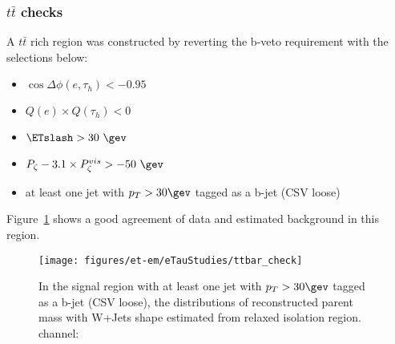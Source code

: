 \subsubsection{$t\bar{t}$ checks}
A $t\bar{t}$ rich region was constructed by reverting the b-veto requirement with
the selections below:
\begin{itemize}
  \item $\cos{\Delta \phi (e,\tau_{h})}<-0.95$
  \item $Q(e) \times Q(\tau_{h}) < 0 $
  \item $\ETslash>30~\gev$
  \item $P_{\zeta}- 3.1 \times P_{\zeta}^{vis} > -50~\gev$
  \item at least one jet with $p_T>30\gev$ tagged as a b-jet (CSV loose)
\end{itemize}

Figure~\ref{fig:ttbar} shows a good agreement of data and estimated background in this region.

\begin{figure}\centering
  \texttt{[image: figures/et-em/eTauStudies/ttbar\_check]}
  \caption{\label{fig:ttbar} In the signal region with at least 
    one jet with $p_T>30\gev$ tagged as a b-jet (CSV loose),
    the distributions of reconstructed parent mass with
    W+Jets shape estimated from relaxed \tauh isolation region.
    \teth channel: \meffetau}
\end{figure}

